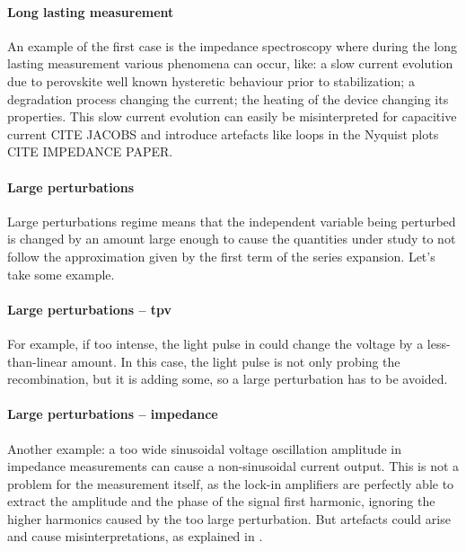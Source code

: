 		\paragraph{Long lasting measurement} An example of the first case is the impedance spectroscopy where during the long lasting measurement various phenomena can occur, like: a slow current evolution due to perovskite well known hysteretic behaviour prior to stabilization; a degradation process changing the current; the heating of the device changing its properties. This slow current evolution can easily be misinterpreted for capacitive current CITE JACOBS and introduce artefacts like loops in the Nyquist plots CITE IMPEDANCE PAPER.

		\paragraph{Large perturbations} Large perturbations regime means that the independent variable being perturbed is changed by an amount large enough to cause the quantities under study to not follow the approximation given by the first term of the series expansion. Let's take some example.

		\paragraph{Large perturbations -- \gls{tpv}} For example, if too intense, the light pulse in  could change the voltage by a less-than-linear amount. In this case, the light pulse is not only probing the recombination, but it is adding some, so a large perturbation has to be avoided.

		\paragraph{Large perturbations -- impedance} Another example: a too wide sinusoidal voltage oscillation amplitude in impedance measurements can cause a non-sinusoidal current output. This is not a problem for the measurement itself, as the lock-in amplifiers are perfectly able to extract the amplitude and the phase of the signal first harmonic, ignoring the higher harmonics caused by the too large perturbation. But artefacts could arise and cause misinterpretations, as explained in .


